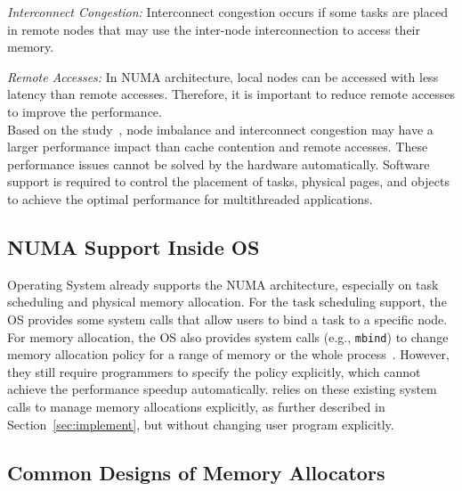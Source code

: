 \textit{Interconnect Congestion:} Interconnect congestion occurs if some tasks are placed in remote nodes that may use the inter-node interconnection to access their memory. 

\textit{Remote Accesses:} In NUMA architecture, local nodes can be accessed with less latency than remote accesses. Therefore, it is important to reduce remote accesses to improve the performance.\\


 Based on the study~\citep{Blagodurov:2011:CNC:2002181.2002182}, node imbalance and interconnect congestion may have a larger performance impact than cache contention and remote accesses. These performance issues cannot be solved by the hardware automatically. Software support is required to control the placement of tasks, physical pages, and objects to achieve the optimal performance for multithreaded applications.  

\subsection{NUMA Support Inside OS} 
Operating System already supports the NUMA architecture, especially on task scheduling and physical memory allocation. For the task scheduling support, the OS provides some system calls that allow users to bind a task to a specific node. For memory allocation, the OS also provides system calls (e.g., \texttt{mbind}) to change memory allocation policy for a range of memory or the whole process~\citep{lameter2013numa, diener2015locality}. However, they still require programmers to specify the policy explicitly, which cannot achieve the performance speedup automatically. \NM{} relies on these existing system calls to manage memory allocations explicitly, as further described in Section~\ref{sec:implement}, but without changing user program explicitly.

\subsection{Common Designs of Memory Allocators}
\label{sec:commondesign}

